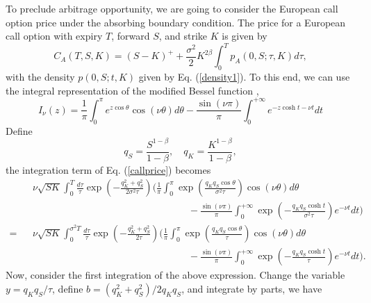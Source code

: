 \documentclass[12pt]{article}
\begin{document}
  To preclude arbitrage opportunity, we are going to consider the European call option price under the absorbing boundary condition.
  The price for a European call option with expiry $T$, forward $S$, and strike $K$ is given by
  \begin{equation}
    C_A(T,S,K) = (S-K)^+ + \frac{\sigma^2}{2}K^{2\beta}\int_0^Tp_A(0,S;\tau,K)d\tau,
    \label{callprice}
  \end{equation}
  with the density $p(0,S;t,K)$ given by Eq. (\ref{density1}). To this end, we can use the integral representation of the modified
  Bessel function \cite{DLMF2},
  \begin{equation}
    I_{\nu}(z) = \frac{1}{\pi}\int_0^{\pi}e^{z\cos\theta}\cos(\nu\theta)d\theta
                - \frac{\sin(\nu\pi)}{\pi}\int_0^{+\infty}e^{-z\cosh t - \nu t}dt
  \end{equation}
  Define
  \begin{equation}
    q_S=\frac{S^{1-\beta}}{1-\beta}, \quad q_K=\frac{K^{1-\beta}}{1-\beta},
  \end{equation}
  the integration term of Eq. (\ref{callprice}) becomes
  \begin{eqnarray}
    && \nu\sqrt{SK}\int_0^T\frac{d\tau}{\tau}\exp\left(-\frac{q_K^2+q_S^2}{2\sigma^2\tau}\right)
    \Bigg(\frac{1}{\pi}\int_0^{\pi}\exp\left(\frac{q_Kq_S\cos\theta}{\sigma^2\tau}\right)\cos(\nu\theta)d\theta\nonumber\\
    && \quad\quad\quad\quad\quad\quad\quad\quad\quad\quad\quad\quad\quad\quad\quad\quad
            - \frac{\sin(\nu\pi)}{\pi}\int_0^{+\infty}\exp\left(-\frac{q_Kq_S\cosh t}{\sigma^2\tau}\right)e^{-\nu t}dt\Bigg)\nonumber\\
    = && \nu\sqrt{SK}\int_0^{\sigma^2 T}\frac{d\tau}{\tau}\exp\left(-\frac{q_K^2+q_S^2}{2\tau}\right)
    \Bigg(\frac{1}{\pi}\int_0^{\pi}\exp\left(\frac{q_Kq_S\cos\theta}{\tau}\right)\cos(\nu\theta)d\theta\nonumber\\
    && \quad\quad\quad\quad\quad\quad\quad\quad\quad\quad\quad\quad\quad\quad\quad\quad
            - \frac{\sin(\nu\pi)}{\pi}\int_0^{+\infty}\exp\left(-\frac{q_Kq_S\cosh t}{\tau}\right)e^{-\nu t}dt\Bigg).
  \end{eqnarray}
  Now, consider the first integration of the above expression. Change the variable $y=q_Kq_S/\tau$, define
  $b=(q_K^2+q_S^2)/2q_Kq_S$, and integrate by parts, we have
\end{document}

